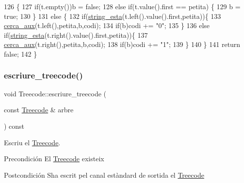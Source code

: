 \begin{DoxyCode}
126                                                                                                         \{
127     \textcolor{keywordflow}{if}(t.empty())b = \textcolor{keyword}{false};
128     \textcolor{keywordflow}{else} \textcolor{keywordflow}{if}(t.value().first == petita) \{
129         b = \textcolor{keyword}{true};
130     \}
131     \textcolor{keywordflow}{else} \{
132         \textcolor{keywordflow}{if}(\hyperlink{_treecode_8cc_a296ac1f687f24e1b4c27432d04bc2c98}{string\_esta}(t.left().value().first,petita))\{
133             \hyperlink{class_treecode_ac320d8634179b2ab24dc89bd706264ca}{cerca\_aux}(t.left(),petita,b,codi);
134             \textcolor{keywordflow}{if}(b)codi += \textcolor{stringliteral}{"0"};
135         \}
136         \textcolor{keywordflow}{else} \textcolor{keywordflow}{if}(\hyperlink{_treecode_8cc_a296ac1f687f24e1b4c27432d04bc2c98}{string\_esta}(t.right().value().first,petita))\{
137             \hyperlink{class_treecode_ac320d8634179b2ab24dc89bd706264ca}{cerca\_aux}(t.right(),petita,b,codi);
138             \textcolor{keywordflow}{if}(b)codi += \textcolor{stringliteral}{"1"};
139         \}
140     \}
141     \textcolor{keywordflow}{return} \textcolor{keyword}{false};
142 \}
\end{DoxyCode}
\mbox{\label{class_treecode_acfa6c1b465b514251f7101b61195d50f}} 
\subsubsection{\texorpdfstring{escriure\+\_\+treecode()}{escriure\_treecode()}}
{\footnotesize\ttfamily void Treecode\+::escriure\+\_\+treecode (\begin{DoxyParamCaption}\item[{const \hyperlink{class_treecode}{Treecode} \&}]{arbre }\end{DoxyParamCaption}) const}



Escriu el \hyperlink{class_treecode}{Treecode}. 

\begin{DoxyPrecond}{Precondición}
El \hyperlink{class_treecode}{Treecode} existeix 
\end{DoxyPrecond}
\begin{DoxyPostcond}{Postcondición}
S\textquotesingle{}ha escrit pel canal estàndard de sortida el \hyperlink{class_treecode}{Treecode} 
\end{DoxyPostcond}


